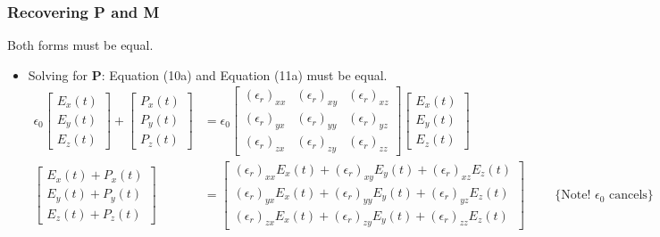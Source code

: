 \subsubsection{Recovering P and M}
Both forms must be equal.
\begin{itemize}
  \item Solving for \( \mathbf{P} \): Equation (10a)
    and Equation (11a) must be equal.
    \begin{align*}
      \epsilon_0
      \begin{bmatrix}
        E_x(t) \\
        E_y(t) \\
        E_z(t)
      \end{bmatrix} +
      \begin{bmatrix}
        P_x(t) \\
        P_y(t) \\
        P_z(t)
      \end{bmatrix}
      &= \epsilon_0
      \begin{bmatrix}
        (\epsilon_r)_{xx} & (\epsilon_r)_{xy} & (\epsilon_r)_{xz} \\
        (\epsilon_r)_{yx} & (\epsilon_r)_{yy} & (\epsilon_r)_{yz} \\
        (\epsilon_r)_{zx} & (\epsilon_r)_{zy} & (\epsilon_r)_{zz}
      \end{bmatrix}
      \begin{bmatrix}
        E_x(t) \\
        E_y(t) \\
        E_z(t)
      \end{bmatrix} \\
      \begin{bmatrix}
        E_x(t) + P_x(t) \\
        E_y(t) + P_y(t) \\
        E_z(t) + P_z(t)
      \end{bmatrix}
      &=
      \begin{bmatrix}
        (\epsilon_r)_{xx} E_x(t) + (\epsilon_r)_{xy} E_y(t) + (\epsilon_r)_{xz} E_z(t) \\
        (\epsilon_r)_{yx} E_x(t) + (\epsilon_r)_{yy} E_y(t) + (\epsilon_r)_{yz} E_z(t) \\
        (\epsilon_r)_{zx} E_x(t) + (\epsilon_r)_{zy} E_y(t) + (\epsilon_r)_{zz} E_z(t)
      \end{bmatrix} \hspace{1cm} \text{\{Note! \(\epsilon_0\) cancels\}} \\

\end{align*}
\end{itemize}
